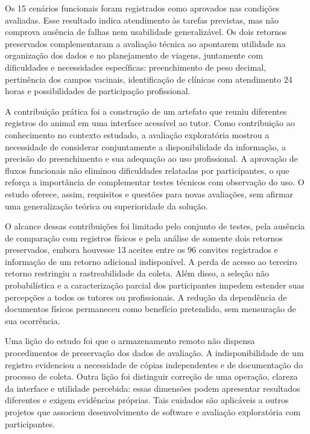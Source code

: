 \documentclass{UNESC}
\begin{document}
Os 15 cenários funcionais foram registrados como aprovados nas condições avaliadas. Esse resultado indica atendimento às tarefas previstas, mas não comprova ausência de falhas nem usabilidade generalizável. Os dois retornos preservados complementaram a avaliação técnica ao apontarem utilidade na organização dos dados e no planejamento de viagens, juntamente com dificuldades e necessidades específicas: preenchimento de peso decimal, pertinência dos campos vacinais, identificação de clínicas com atendimento 24 horas e possibilidades de participação profissional.

A contribuição prática foi a construção de um artefato que reuniu diferentes registros do animal em uma interface acessível ao tutor. Como contribuição ao conhecimento no contexto estudado, a avaliação exploratória mostrou a necessidade de considerar conjuntamente a disponibilidade da informação, a precisão do preenchimento e sua adequação ao uso profissional. A aprovação de fluxos funcionais não eliminou dificuldades relatadas por participantes, o que reforça a importância de complementar testes técnicos com observação do uso. O estudo oferece, assim, requisitos e questões para novas avaliações, sem afirmar uma generalização teórica ou superioridade da solução.

O alcance dessas contribuições foi limitado pelo conjunto de testes, pela ausência de comparação com registros físicos e pela análise de somente dois retornos preservados, embora houvesse 13 aceites entre os 96 convites registrados e informação de um retorno adicional indisponível. A perda de acesso ao terceiro retorno restringiu a rastreabilidade da coleta. Além disso, a seleção não probabilística e a caracterização parcial dos participantes impedem estender suas percepções a todos os tutores ou profissionais. A redução da dependência de documentos físicos permaneceu como benefício pretendido, sem mensuração de sua ocorrência.

Uma lição do estudo foi que o armazenamento remoto não dispensa procedimentos de preservação dos dados de avaliação. A indisponibilidade de um registro evidenciou a necessidade de cópias independentes e de documentação do processo de coleta. Outra lição foi distinguir correção de uma operação, clareza da interface e utilidade percebida: essas dimensões podem apresentar resultados diferentes e exigem evidências próprias. Tais cuidados são aplicáveis a outros projetos que associem desenvolvimento de software e avaliação exploratória com participantes.
\end{document}

